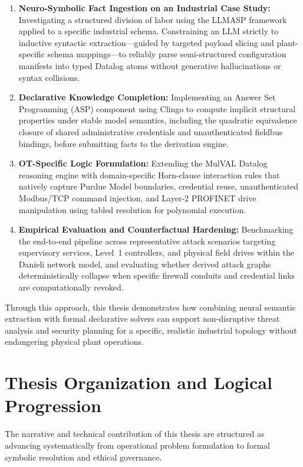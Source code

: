 \documentclass[target=mst,aauheader=aics,style=]{thud}
\begin{document}
\begin{enumerate}
    \item \textbf{Neuro-Symbolic Fact Ingestion on an Industrial Case Study:} Investigating a structured division of labor using the LLMASP framework applied to a specific industrial schema. Constraining an LLM strictly to inductive syntactic extraction---guided by targeted payload slicing and plant-specific schema mappings---to reliably parse semi-structured configuration manifests into typed Datalog atoms without generative hallucinations or syntax collisions.
    \item \textbf{Declarative Knowledge Completion:} Implementing an Answer Set Programming (ASP) component using Clingo to compute implicit structural properties under stable model semantics, including the quadratic equivalence closure of shared administrative credentials and unauthenticated fieldbus bindings, before submitting facts to the derivation engine.
    \item \textbf{OT-Specific Logic Formulation:} Extending the MulVAL Datalog reasoning engine with domain-specific Horn-clause interaction rules that natively capture Purdue Model boundaries, credential reuse, unauthenticated Modbus/TCP command injection, and Layer-2 PROFINET drive manipulation using tabled resolution for polynomial execution.
    \item \textbf{Empirical Evaluation and Counterfactual Hardening:} Benchmarking the end-to-end pipeline across representative attack scenarios targeting supervisory services, Level~1 controllers, and physical field drives within the Danieli network model, and evaluating whether derived attack graphs deterministically collapse when specific firewall conduits and credential links are computationally revoked.
\end{enumerate}
Through this approach, this thesis demonstrates how combining neural semantic extraction with formal declarative solvers can support non-disruptive threat analysis and security planning for a specific, realistic industrial topology without endangering physical plant operations.

\section{Thesis Organization and Logical Progression}
\label{sec:thesis_organization}
The narrative and technical contribution of this thesis are structured as advancing systematically from operational problem formulation to formal symbolic resolution and ethical governance.
\end{document}
